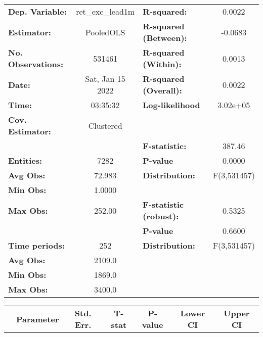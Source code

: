 \begin{center}
\begin{tabular}{lclc}
\toprule
\textbf{Dep. Variable:}    &  ret\_exc\_lead1m  & \textbf{  R-squared:         }   &      0.0022      \\
\textbf{Estimator:}        &     PooledOLS      & \textbf{  R-squared (Between):}  &     -0.0683      \\
\textbf{No. Observations:} &       531461       & \textbf{  R-squared (Within):}   &      0.0013      \\
\textbf{Date:}             &  Sat, Jan 15 2022  & \textbf{  R-squared (Overall):}  &      0.0022      \\
\textbf{Time:}             &      03:35:32      & \textbf{  Log-likelihood     }   &     3.02e+05     \\
\textbf{Cov. Estimator:}   &     Clustered      & \textbf{                     }   &                  \\
\textbf{}                  &                    & \textbf{  F-statistic:       }   &      387.46      \\
\textbf{Entities:}         &        7282        & \textbf{  P-value            }   &      0.0000      \\
\textbf{Avg Obs:}          &       72.983       & \textbf{  Distribution:      }   &   F(3,531457)    \\
\textbf{Min Obs:}          &       1.0000       & \textbf{                     }   &                  \\
\textbf{Max Obs:}          &       252.00       & \textbf{  F-statistic (robust):} &      0.5325      \\
\textbf{}                  &                    & \textbf{  P-value            }   &      0.6600      \\
\textbf{Time periods:}     &        252         & \textbf{  Distribution:      }   &   F(3,531457)    \\
\textbf{Avg Obs:}          &       2109.0       & \textbf{                     }   &                  \\
\textbf{Min Obs:}          &       1869.0       & \textbf{                     }   &                  \\
\textbf{Max Obs:}          &       3400.0       & \textbf{                     }   &                  \\
\bottomrule
\end{tabular}
\begin{tabular}{lcccccc}
                & \textbf{Parameter} & \textbf{Std. Err.} & \textbf{T-stat} & \textbf{P-value} & \textbf{Lower CI} & \textbf{Upper CI}  \\

\end{tabular}
\end{center}
